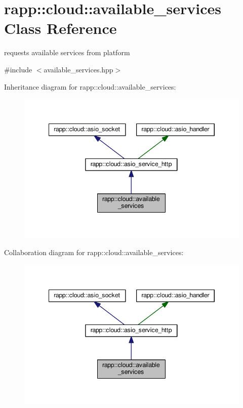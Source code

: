 \hypertarget{classrapp_1_1cloud_1_1available__services}{\section{rapp\-:\-:cloud\-:\-:available\-\_\-services Class Reference}
\label{classrapp_1_1cloud_1_1available__services}
}


requests available services from platform  




{\ttfamily \#include $<$available\-\_\-services.\-hpp$>$}



Inheritance diagram for rapp\-:\-:cloud\-:\-:available\-\_\-services\-:
\nopagebreak
\begin{figure}[H]
\begin{center}
\leavevmode
\includegraphics[width=345pt]{classrapp_1_1cloud_1_1available__services__inherit__graph}
\end{center}
\end{figure}


Collaboration diagram for rapp\-:\-:cloud\-:\-:available\-\_\-services\-:
\nopagebreak
\begin{figure}[H]
\begin{center}
\leavevmode
\includegraphics[width=345pt]{classrapp_1_1cloud_1_1available__services__coll__graph}
\end{center}
\end{figure}
